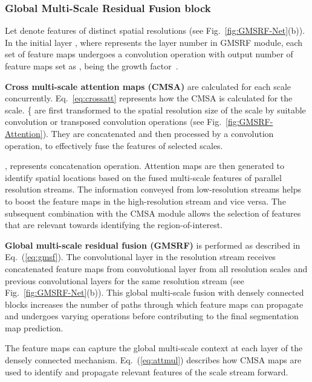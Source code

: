 \documentclass[conference]{IEEEtran}
\begin{document}
\subsubsection{Global Multi-Scale Residual Fusion block}
Let  denote features of distinct spatial resolutions (see Fig.~\ref{fig:GMSRF-Net}(b)). In the initial layer , where  represents the layer number in GMSRF module, each set of feature maps undergoes a convolution operation with output number of feature maps set as ,  being the growth factor~\cite{huang2017densely}. 


\textbf{Cross multi-scale attention maps (CMSA)} are calculated for each scale concurrently. Eq.~\ref{eq:crossatt} represents how the  CMSA is calculated for the  scale. \{ are first transformed to the spatial resolution size of the  scale by suitable convolution or transposed convolution operations (see Fig.~\ref{fig:GMSRF-Attention}). They are concatenated and then processed by a  convolution operation, to effectively fuse the features of selected scales. 

,  represents concatenation operation. Attention maps are then generated to identify spatial locations based on the fused multi-scale features of parallel resolution streams. The information conveyed from low-resolution streams helps to boost the feature maps in the high-resolution stream and vice versa. The subsequent combination with the CMSA module allows the selection of features that are relevant towards identifying the region-of-interest.



\textbf{Global multi-scale residual fusion (GMSRF)} is performed as described in Eq.~(\ref{eq:gmsf}). The  convolutional layer in the  resolution stream receives concatenated feature maps from  convolutional layer from all resolution scales and previous convolutional layers for the same resolution stream (see Fig.~\ref{fig:GMSRF-Net}(b)). This global multi-scale fusion with densely connected blocks increases the number of paths through which feature maps can propagate and undergoes varying operations before contributing to the final segmentation map prediction.

The feature maps can capture the global multi-scale context at each layer of the densely connected mechanism. Eq.~(\ref{eq:attmul}) describes how CMSA maps are used to identify and propagate relevant features of the  scale stream forward.
\end{document}
